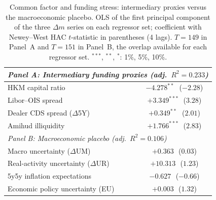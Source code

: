 \begin{table}[H]
\centering
\caption{Common factor and funding stress: intermediary proxies versus the
macroeconomic placebo. OLS of the first principal component of the three
$\Delta m$ series on each regressor set; coefficient with Newey--West HAC
$t$-statistic in parentheses (4 lags). $T=149$ in Panel~A and $T=151$ in
Panel~B, the overlap available for each regressor set.
$^{***}$, $^{**}$, $^{*}$: 1\%, 5\%, 10\%.}
\small
\begin{tabular}{lc}
\toprule
\multicolumn{2}{l}{\emph{Panel A: Intermediary funding proxies (adj.\ $R^2=0.233$)}}\\
\midrule
HKM capital ratio & $-4.278^{**}$\ \,($-2.28$) \\
Libor--OIS spread & $+3.349^{***}$\ \,($3.28$) \\
Dealer CDS spread ($\Delta$5Y) & $+0.349^{**}$\ \,($2.01$) \\
Amihud illiquidity & $+1.766^{***}$\ \,($2.83$) \\
\midrule
\multicolumn{2}{l}{\emph{Panel B: Macroeconomic placebo (adj.\ $R^2=0.106$)}}\\
\midrule
Macro uncertainty ($\Delta$UM) & $+0.363$\ \,($0.03$) \\
Real-activity uncertainty ($\Delta$UR) & $+10.313$\ \,($1.23$) \\
5y5y inflation expectations & $-0.627$\ \,($-0.66$) \\
Economic policy uncertainty (EU) & $+0.003$\ \,($1.32$) \\
\bottomrule
\end{tabular}
\end{table}